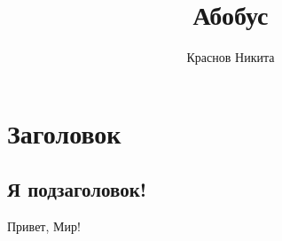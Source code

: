 \documentclass[empty]{mirea}
\title{Абобус}
\author{Краснов Никита}
\begin{document}
	\maketitle
	
	\chapter{Заголовок}
	\section{Я подзаголовок!}
	Привет, Мир!
\end{document}
